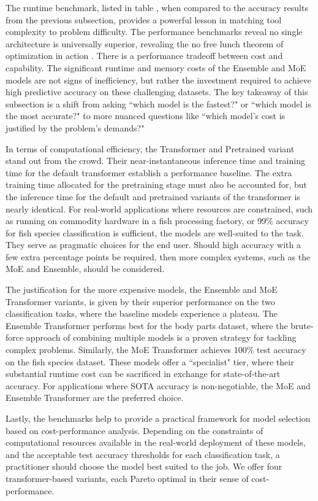 The runtime benchmark, listed in table , when compared to the accuracy results from the previous subsection, provides a powerful lesson in matching tool complexity to problem difficulty. The performance benchmarks reveal no single architecture is universally superior, revealing the no free lunch theorem of optimization in action \citep{Wolpert2002}. There is a performance tradeoff between cost and capability. The significant runtime and memory costs of the Ensemble and MoE models are not signs of inefficiency, but rather the investment required to achieve high predictive accuracy on these challenging datasets. The key takeaway of this subsection is a shift from asking ``which model is the fastest?" or ``which model is the most accurate?" to more nuanced questions like ``which model's cost is justified by the problem's demands?"

In terms of computational efficiency, the Transformer and Pretrained variant stand out from the crowd. Their near-instantaneous inference time and training time for the default transformer establish a performance baseline. The extra training time allocated for the pretraining stage must also be accounted for, but the inference time for the default and pretrained variants of the transformer is nearly identical. For real-world applications where resources are constrained, such as running on commodity hardware in a fish processing factory, or 99\% accuracy for fish species classification is sufficient, the models are well-suited to the task. They serve as pragmatic choices for the end user. Should high accuracy with a few extra percentage points be required, then more complex systems, such as the MoE and Ensemble, should be considered.

The justification for the more expensive models, the Ensemble and MoE Transformer variants, is given by their superior performance on the two classification tasks, where the baseline models experience a plateau. The Ensemble Transformer performs best for the body parts dataset, where the brute-force approach of combining multiple models is a proven strategy for tackling complex problems. Similarly, the MoE Transformer achieves 100\% test accuracy on the fish species dataset. These models offer a ``specialist" tier, where their substantial runtime cost can be sacrificed in exchange for state-of-the-art accuracy. For applications where SOTA accuracy is non-negotiable, the MoE and Ensemble Transformer are the preferred choice.

Lastly, the benchmarks help to provide a practical framework for model selection based on cost-performance analysis. Depending on the constraints of computational resources available in the real-world deployment of these models, and the acceptable test accuracy thresholds for each classification task, a practitioner should choose the model best suited to the job. We offer four transformer-based variants, each Pareto optimal in their sense of cost-performance.

